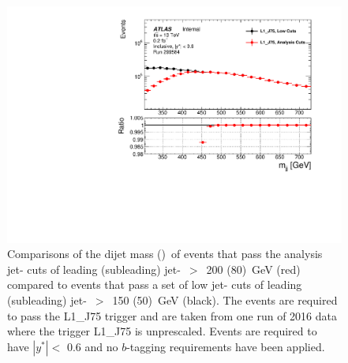 \begin{figure}[!ht]
  \begin{center}
    \includegraphics[width=0.55\linewidth, angle=0]{figs/Dibjet/LowMass/evt-mjj_yStar0p6.pdf}
  \end{center}
  \vspace{-1em}
  \caption[Derivations of the dijet mass cut for the \lm{} data-set event selection.]
          {Comparisons of the dijet mass (\mjj{})~of events that pass the analysis jet-\pT{} cuts of leading (subleading) jet-\pT{}~$>$~200 (80)~GeV (red)
    compared to events that pass a set of low jet-\pT{} cuts of leading (subleading) jet-\pT{}~$>$~150 (50)~GeV (black).
    The events are required to pass the L1\_J75 trigger and are taken from one run of 2016 data where the trigger L1\_J75 is unprescaled.
    Events are required to have $|y^*| <$ 0.6 and no $b$-tagging requirements have been applied.}
     \label{fig:evt-lowmass_turnon}
\end{figure}




